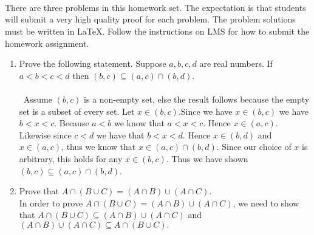 \documentclass[11pt]{article}
\begin{document}
\\
\\
\\
There are three problems in this homework set. The expectation is that students
will submit a very high quality proof for each problem. The problem solutions must be written
in LaTeX. Follow the instructions on LMS for how to submit the homework assignment.


\begin{enumerate}
\item Prove the following statement. 
Suppose $a,b,c,d$ are real numbers. 
If $a < b < c < d$ then $ (b,c) \subseteq (a,c) \cap (b,d) $.\\\\\
	Assume $(b,c)$ is a non-empty set, else the result follows because the empty set is a subset of every set. Let $x \in (b,c)$.Since we have $x \in (b,c)$ we have $b < x < c$. Because $a < b$  we know that $a < x < c$. Hence $x \in (a,c)$. Likewise since $c < d$ we have that $b < x < d$. Hence $x \in (b,d)$ and $x \in (a,c)$, thus we know that $x \in (a,c)\cap (b,d)$. Since our choice of $x$ is arbitrary, this holds for any $x \in (b,c)$. Thus we have shown $(b,c)\subseteq (a,c) \cap (b,d)$.
\bigskip 
\item Prove that $A \cap (B \cup C) = (A \cap B) \cup (A \cap C) $. \\

 In order to prove $A \cap (B \cup C) = (A \cap B) \cup (A \cap C) $, we need to show that $A \cap (B \cup C) \subseteq (A \cap B) \cup (A \cap C)$ and $(A \cap B) \cup (A \cap C) \subseteq A \cap (B \cup C).$ 
 

\end{enumerate}
\end{document}
